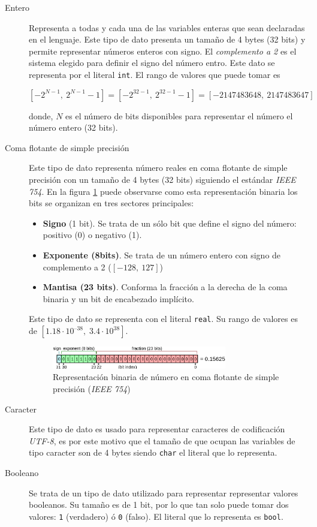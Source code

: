 \documentclass[11pt, english]{article}
\begin{document}
\begin{description}
	\item[Entero] Representa a todas y cada una de las variables enteras que sean declaradas en el lenguaje. Este tipo de dato presenta un tamaño de 4 bytes (32 bits) y permite representar números enteros con signo. El \emph{complemento a 2} es el sistema elegido para definir el signo del número entro. Este dato se representa por el literal \texttt{int}. El rango de valores que puede tomar es 
	
	\begin{equation}\label{eq:equation1}
		\left [-2^{N-1},\: 2^{N-1}-1 \right ] = \left [-2^{32-1},\: 2^{32-1}-1 \right] = \left [-2147483648,\: 2147483647 \right]
	\end{equation}
	
	donde, $N$ es el número de bits disponibles para representar el número el número entero (32 bits).
	\item[Coma flotante de simple precisión] Este tipo de dato representa número reales en coma flotante de simple precisión con un tamaño de 4 bytes (32 bits) siguiendo el estándar \emph{IEEE 754}. En la figura \ref{fig:figure1} puede observarse como esta representación binaria los bits se organizan en tres sectores principales:
	\begin{itemize}
		\item \textbf{Signo} (1 bit). Se trata de un sólo bit que define el signo del número: positivo (0) o negativo (1).
		\item  \textbf{Exponente (8bits)}. Se trata de un número entero con signo de complemento a 2 ($\left [ -128,\: 127\right ]$)
		\item \textbf{Mantisa (23 bits)}. Conforma la fracción a la derecha de la coma binaria y un bit de encabezado implícito.
	\end{itemize}
	Este tipo de dato se representa con el literal \texttt{real}. Su rango de valores es de $\left [ 1.18 \cdot 10^{–38},\; 3.4 \cdot 10^{38} \right ]$.
	\begin{figure}[H]\label{fig:figure1}
		\centering
		\includegraphics[width=0.75\textwidth]{../res/pics/data-types/float_diag.png}
		\caption{Representación binaria de número en coma flotante de simple precisión (\emph{IEEE 754})}
	\end{figure}

	\item[Caracter] Este tipo de dato es usado para representar caracteres de codificación \emph{UTF-8}, es por este motivo que el tamaño de que ocupan las variables de tipo caracter son de 4 bytes siendo \texttt{char} el literal que lo representa.
	\item[Booleano] Se trata de un tipo de dato utilizado para representar representar valores booleanos. Su tamaño es de 1 bit, por lo que tan solo puede tomar dos valores: \texttt{1} (verdadero) ó \texttt{0} (falso). El literal que lo representa es \texttt{bool}.
\end{description} 
\end{document}
